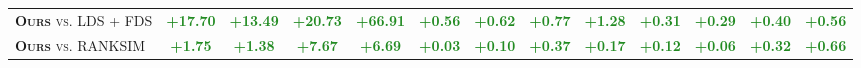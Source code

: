 \begin{table*}[h]
\begin{center}
{\begin{tabular}{l|cccc|cccc|cccc}
\textsc{\textbf{Ours} vs. LDS + FDS} & \textcolor{ForestGreen}{\textbf{+17.70}} & \textcolor{ForestGreen}{\textbf{+13.49}} & \textcolor{ForestGreen}{\textbf{+20.73}} & \textcolor{ForestGreen}{\textbf{+66.91}} & \textcolor{ForestGreen}{\textbf{+0.56}} & \textcolor{ForestGreen}{\textbf{+0.62}} & \textcolor{ForestGreen}{\textbf{+0.77}} & \textcolor{ForestGreen}{\textbf{+1.28}} & \textcolor{ForestGreen}{\textbf{+0.31}} & \textcolor{ForestGreen}{\textbf{+0.29}} & \textcolor{ForestGreen}{\textbf{+0.40}} & \textcolor{ForestGreen}{\textbf{+0.56}}  \\[1.5pt]
\textsc{\textbf{Ours} vs. RANKSIM} & \textcolor{ForestGreen}{\textbf{+1.75}} & \textcolor{ForestGreen}{\textbf{+1.38}} & \textcolor{ForestGreen}{\textbf{+7.67}} & \textcolor{ForestGreen}{\textbf{+6.69}} & \textcolor{ForestGreen}{\textbf{+0.03}} & \textcolor{ForestGreen}{\textbf{+0.10}} & \textcolor{ForestGreen}{\textbf{+0.37}} & \textcolor{ForestGreen}{\textbf{+0.17}} & \textcolor{ForestGreen}{\textbf{+0.12}} & \textcolor{ForestGreen}{\textbf{+0.06}} & \textcolor{ForestGreen}{\textbf{+0.32}} & \textcolor{ForestGreen}{\textbf{+0.66}} \\
\bottomrule[1.5pt]
\end{tabular}}
\end{center}
\vspace{-0.7cm}
\end{table*}
%
